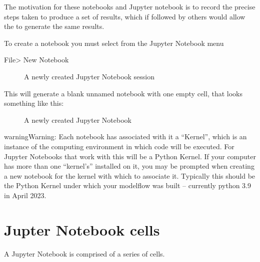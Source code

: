 \documentclass[letterpaper,10pt,english]{jupyterBook}
\let\sphinxpxdimen\pdfpxdimen\else\newdimen\sphinxpxdimen
\begin{document}
\sphinxAtStartPar
The motivation for these notebooks and Jupyter notebook is to record the precise steps taken to produce a set of results, which if followed by others would allow the to generate the same results.

\sphinxAtStartPar
To create a notebook you must select from the Jupyter Notebook menu

\sphinxAtStartPar
File\sphinxhyphen{}> New Notebook

\begin{figure}[htbp]
\centering
\capstart

\noindent\sphinxincludegraphics[height=150\sphinxpxdimen]{{NewNotebook}.png}
\caption{A newly created Jupyter Notebook session}\label{\detokenize{content/04_PythonEssentials/Intro_Jupyter_notebook:new-notebook}}\end{figure}

\sphinxAtStartPar
This will generate a blank unnamed notebook with one empty cell, that looks something like this:

\begin{figure}[htbp]
\centering
\capstart

\noindent\sphinxincludegraphics[height=225\sphinxpxdimen]{{Newcell}.png}
\caption{A newly created Jupyter Notebook}\label{\detokenize{content/04_PythonEssentials/Intro_Jupyter_notebook:id1}}\end{figure}

\begin{sphinxadmonition}{warning}{Warning:}
\sphinxAtStartPar
Each notebook has associated with it a “Kernel”, which is an instance of the computing environment in which code will be executed. For Jupyter Notebooks that work with  this will be a Python Kernel. If your computer has more than one “kernel’s” installed on it, you may be prompted when creating a new notebook for the kernel with which to associate it.  Typically this should be the Python Kernel under which your modelflow was built – currently python 3.9 in April 2023.
\end{sphinxadmonition}


\section{Jupter Notebook cells}
\label{\detokenize{content/04_PythonEssentials/Intro_Jupyter_notebook:jupter-notebook-cells}}
\sphinxAtStartPar
A Jupyter Notebook is comprised of a series of cells.
\end{document}
